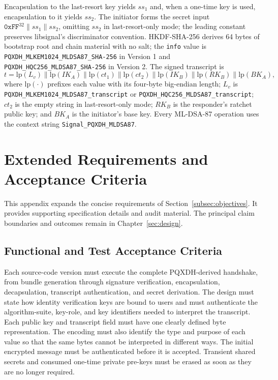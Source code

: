 Encapsulation to the last-resort key yields \(ss_1\) and, when a one-time key is used, encapsulation to it yields \(ss_2\). The initiator forms the secret input \(\mathtt{0xFF}^{32} \parallel ss_1 \parallel ss_2\), omitting \(ss_2\) in last-resort-only mode; the leading constant preserves libsignal's discriminator convention. HKDF-SHA-256 derives 64 bytes of bootstrap root and chain material with no salt; the \texttt{info} value is \texttt{PQXDH\_MLKEM1024\_MLDSA87\_SHA-256} in Version 1 and \texttt{PQXDH\_HQC256\_MLDSA87\_SHA-256} in Version 2. The signed transcript is
\[
t = \mathrm{lp}(L_v) \parallel \mathrm{lp}(IK_A) \parallel
\mathrm{lp}(ct_1) \parallel \mathrm{lp}(ct_2) \parallel
\mathrm{lp}(IK_B) \parallel \mathrm{lp}(RK_B) \parallel
\mathrm{lp}(BK_A),
\]
where \(\mathrm{lp}(\cdot)\) prefixes each value with its four-byte big-endian length; \(L_v\) is \texttt{PQXDH\_MLKEM1024\_\allowbreak MLDSA87\_transcript} or \texttt{PQXDH\_HQC256\_\allowbreak MLDSA87\_transcript}; \(ct_2\) is the empty string in last-resort-only mode; \(RK_B\) is the responder's ratchet public key; and \(BK_A\) is the initiator's base key. Every ML-DSA-87 operation uses the context string \texttt{Signal\_PQXDH\_MLDSA87}.

\section{Extended Requirements and Acceptance Criteria}
\label{app:extended-requirements}

This appendix expands the concise requirements of Section~\ref{subsec:objectives}. It provides supporting specification details and audit material. The principal claim boundaries and outcomes remain in Chapter~\ref{sec:design}.

\subsection{Functional and Test Acceptance Criteria}
\label{app:functional-test-criteria}

Each source-code version must execute the complete PQXDH-derived handshake, from bundle generation through signature verification, encapsulation, decapsulation, transcript authentication, and secret derivation. The design must state how identity verification keys are bound to users and must authenticate the algorithm-suite, key-role, and key identifiers needed to interpret the transcript. Each public key and transcript field must have one clearly defined byte representation. The encoding must also identify the type and purpose of each value so that the same bytes cannot be interpreted in different ways. The initial encrypted message must be authenticated before it is accepted. Transient shared secrets and consumed one-time private pre-keys must be erased as soon as they are no longer required.


